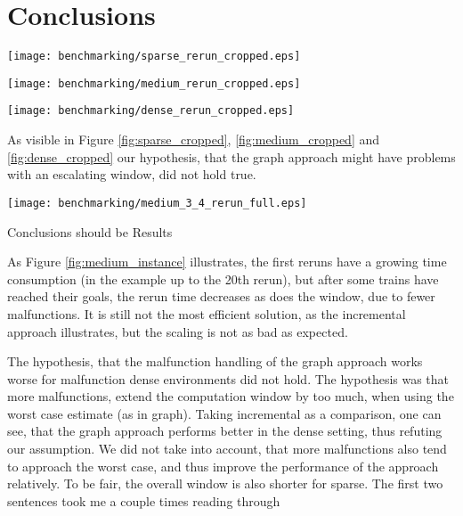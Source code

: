 \section{Conclusions}
\begin{figure*}
    \begin{minipage}[t]{0.32\textwidth}
        \texttt{[image: benchmarking/sparse\_rerun\_cropped.eps]}
        \caption{Sparse: Reruns}
        \label{fig:sparse_cropped}
    \end{minipage}
    \begin{minipage}[t]{0.32\textwidth}
        \texttt{[image: benchmarking/medium\_rerun\_cropped.eps]}
        \caption{Medium: Reruns}
        \label{fig:medium_cropped}
    \end{minipage}
    \begin{minipage}[t]{0.32\textwidth}
        \texttt{[image: benchmarking/dense\_rerun\_cropped.eps]}
        \caption{Dense: Reruns}
        \label{fig:dense_cropped}
    \end{minipage}
\end{figure*}

As visible in Figure \ref{fig:sparse_cropped}, \ref{fig:medium_cropped} and \ref{fig:dense_cropped} our hypothesis, that the graph approach might have problems with an escalating window, did not hold true.

\begin{figure*}
	\texttt{[image: benchmarking/medium\_3\_4\_rerun\_full.eps]}
	\caption{A selected medium Instance, 3\% Malfunction\color{red} I want to explain better what the dots and the colors are\color{black}}
	\label{fig:medium_instance}
\end{figure*}
\color{red} Conclusions should be Results \color{black}


As Figure \ref{fig:medium_instance} illustrates, the first reruns have a growing time consumption (in the example up to the 20th rerun), but after some trains have reached their goals, the rerun time decreases as does the window, due to fewer malfunctions. It is still not the most efficient solution, as the incremental approach illustrates, but the scaling is not as bad as expected.

The hypothesis, that the malfunction handling of the graph approach works worse for malfunction dense environments did not hold. The hypothesis was that more malfunctions, extend the computation window by too much, when using the worst case estimate (as in graph). Taking incremental as a comparison, one can see, that the graph approach performs better in the dense setting, thus refuting our assumption. We did not take into account, that more malfunctions also tend to approach the worst case, and thus improve the performance of the approach relatively.
\color{red}To be fair, the overall window is also shorter for sparse. The first two sentences took me a couple times reading through
\color{black}

